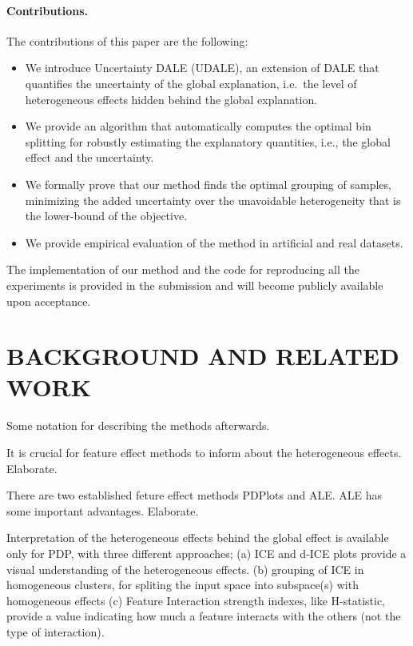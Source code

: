 \documentclass[twoside]{article}
\begin{document}
\paragraph{Contributions.} The contributions of this paper are the following:

\begin{itemize}
  \item We introduce Uncertainty DALE (UDALE), an extension of DALE that quantifies the uncertainty of the global explanation, i.e.~the level of heterogeneous effects hidden behind the global explanation.\item We provide an algorithm that automatically computes the optimal bin splitting for robustly estimating the explanatory quantities, i.e., the global effect and the uncertainty. 
  \item We formally prove that our method finds the optimal grouping of samples, minimizing the added uncertainty over the unavoidable heterogeneity that is the lower-bound of the objective.
  \item We provide empirical evaluation of the method in artificial and real datasets.
\end{itemize}


The implementation of our method and the code for reproducing all the
experiments is provided in the submission and will become publicly
available upon acceptance.


\section{BACKGROUND AND RELATED WORK}

Some notation for describing the methods afterwards.

It is crucial for feature effect methods to inform about the
heterogeneous effects. Elaborate.

There are two established feture effect methods PDPlots and ALE. ALE
has some important advantages. Elaborate.

Interpretation of the heterogeneous effects behind the global effect
is available only for PDP, with three different approaches; (a) ICE
and d-ICE plots provide a visual understanding of the heterogeneous
effects. (b) grouping of ICE in homogeneous clusters, for spliting the
input space into subspace(s) with homogeneous effects (c) Feature
Interaction strength indexes, like H-statistic, provide a value
indicating how much a feature interacts with the others (not the type
of interaction).
\end{document}
